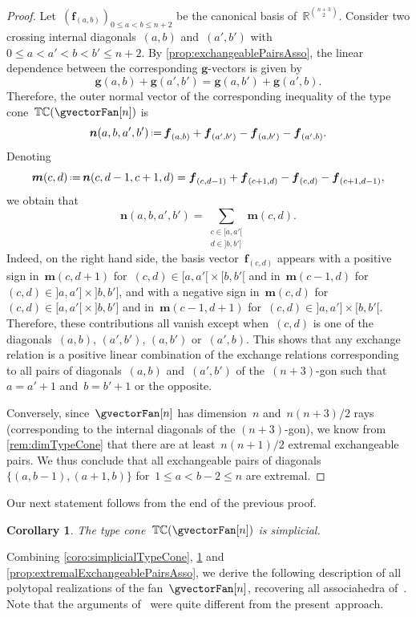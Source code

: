\documentclass{amsart}
\newtheorem{corollary}[theorem]{Corollary}
\theoremstyle{definition}
\newcommand{\R}{\mathbb{R}} %
\renewcommand{\b}[1]{{\boldsymbol{#1}}} %
\newcommand{\eqdef}{\mbox{\,\raisebox{0.2ex}{\scriptsize\ensuremath{\mathrm:}}\ensuremath{=}\,}} %
\newcommand{\gvector}[1]{\b{g}(#1)} %
\newcommand{\typeCone}{\mathbb{TC}} %
\begin{document}
\begin{proof}
Let~$(\b{f}_{(a,b)})_{0 \le a < b \le n+2}$ be the canonical basis of~$\R^{\binom{n+3}{2}}$.
Consider two crossing internal diagonals~$(a,b)$ and~$(a',b')$ with~$0 \le a < a' < b < b' \le n+2$.
By \cref{prop:exchangeablePairsAsso}, the linear dependence between the corresponding $\b{g}$-vectors is given by
\[
\gvector{a,b} + \gvector{a',b'} = \gvector{a,b'} + \gvector{a',b}.
\]
Therefore, the outer normal vector of the corresponding inequality of the type cone~$\typeCone(\gvectorFan[n])$ is
\[
\b{n}(a,b,a',b') \eqdef \b{f}_{(a,b)} + \b{f}_{(a',b')} - \b{f}_{(a,b')} - \b{f}_{(a',b)}.
\]
Denoting
\[
\b{m}(c,d) \eqdef \b{n}(c,d-1,c+1,d) = \b{f}_{(c,d-1)} + \b{f}_{(c+1,d)} - \b{f}_{(c,d)} - \b{f}_{(c+1,d-1)},
\]
we obtain that
\[
\b{n}(a,b,a',b') = \sum_{\substack{c \in {[a,a'[} \\ d \in {]b,b']}}} \b{m}(c,d).
\]
Indeed, on the right hand side, the basis vector~$\b{f}_{(c,d)}$ appears with a positive sign in~$\b{m}(c,d+1)$ for~$(c,d) \in {[a,a'[} \times {[b,b'[}$ and in~$\b{m}(c-1,d)$ for~$(c,d) \in {]a,a']} \times {]b,b']}$, and with a negative sign in~$\b{m}(c,d)$ for~$(c,d) \in {[a,a'[} \times {]b,b']}$ and in~$\b{m}(c-1,d+1)$ for~$(c,d) \in {]a,a']} \times {[b,b'[}$.
Therefore, these contributions all vanish except when~$(c,d)$ is one of the diagonals~$(a,b)$, $(a',b')$, $(a,b')$ or~$(a',b)$.
This shows that any exchange relation is a positive linear combination of the exchange relations corresponding to all pairs of diagonals~$(a,b)$ and~$(a',b')$ of the~$(n+3)$-gon such that~$a = a'+1$ and~$b = b'+1$ or the opposite.

Conversely, since~$\gvectorFan[n]$ has dimension~$n$ and~$n(n+3)/2$ rays (corresponding to the internal diagonals of the $(n+3)$-gon), we know from \cref{rem:dimTypeCone} that there are at least~$n(n+1)/2$ extremal exchangeable pairs. We thus conclude that all exchangeable pairs of diagonals~$\{(a,b-1), (a+1,b)\}$ for~$1 \le a < b-2 \le n$ are extremal.
\end{proof}

Our next statement follows from the end of the previous proof.

\begin{corollary}
\label{coro:simplicialTypeConeAsso}
The type cone~$\typeCone(\gvectorFan[n])$ is simplicial.
\end{corollary}

\enlargethispage{.2cm}
Combining \cref{coro:simplicialTypeCone}, \cref{coro:simplicialTypeConeAsso} and \cref{prop:extremalExchangeablePairsAsso}, we derive the following description of all polytopal realizations of the fan~$\gvectorFan[n]$, recovering all associahedra of~\cite[Sect.~3.2]{ArkaniHamedBaiHeYan}.
Note that the arguments of~\cite[Sect.~3.2]{ArkaniHamedBaiHeYan} were quite different from the present~approach.
\end{document}
